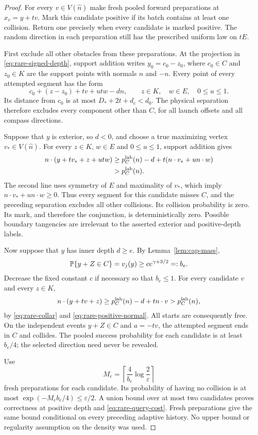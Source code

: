 \begin{proof}
For every $v\in V(\widehat n)$ make fresh pooled forward preparations
at $x_v=y+tv$. Mark this candidate positive if its batch contains at
least one collision. Return one precisely when every candidate is
marked positive. The random direction in each preparation still has
the prescribed uniform law on $tE$.

First exclude all other obstacles from these preparations. At the
projection in \eqref{eq:rare-signed-depth}, support addition writes
$y_0=c_0-z_0$, where $c_0\in C$ and $z_0\in K$ are the support
points with normals $n$ and $-n$. Every point of every attempted
segment has the form
\[
 c_0+(z-z_0)+tv+utw-dn,
       \qquad z\in K,\quad w\in E,\quad 0\le u\le1.
\]
Its distance from $c_0$ is at most $D_*+2t+d_c<d_0$. The physical
separation therefore excludes every component other than $C$, for
all launch offsets and all compass directions.

Suppose that $y$ is exterior, so $d<0$, and choose a true maximizing
vertex $v_*\in V(\widehat n)$. For every $z\in K$, $w\in E$ and
$0\le u\le1$, support addition gives
\begin{align*}
 n\cdot(y+tv_*+z+utw)
 &\ge p_C^{\rm lab}(n)-d+t(n\cdot v_*+u n\cdot w)\\
 &>p_C^{\rm lab}(n).
\end{align*}
The second line uses symmetry of $E$ and maximality of $v_*$, which
imply $n\cdot v_*+u n\cdot w\ge0$. Thus every segment for this
candidate misses $C$, and the preceding separation excludes all other
collisions. Its collision probability is zero. Its mark, and therefore
the conjunction, is deterministically zero. Possible boundary tangencies
are irrelevant to the asserted exterior and positive-depth labels.

Now suppose that $y$ has inner depth $d\ge e$. By
Lemma~\ref{lem:cap-mass},
\[
        \mathbb P\{y+Z\in C\}=v_j(y)
                    \ge c e^{\gamma+3/2}=:b_e.
\]
Decrease the fixed constant $c$ if necessary so that $b_e\le1$.
For every candidate $v$ and every $z\in K$,
\[
 n\cdot(y+tv+z)
       \ge p_C^{\rm lab}(n)-d+t n\cdot v
       >p_C^{\rm lab}(n),
\]
by \eqref{eq:rare-collar} and \eqref{eq:rare-positive-normal}.
All starts are consequently free. On the independent events
$y+Z\in C$ and $a=-tv$, the attempted segment ends in $C$ and
collides. The pooled success probability for each candidate is at
least $b_e/4$; the selected direction need never be revealed.

Use
\[
            M_e=\left\lceil\frac4{b_e}
                                     \log\frac2\varepsilon\right\rceil
\]
fresh preparations for each candidate. Its probability of having no
collision is at most $\exp(-M_eb_e/4)\le\varepsilon/2$.
A union bound over at most two candidates proves correctness at
positive depth and \eqref{eq:rare-query-cost}. Fresh preparations give
the same bound conditional on every preceding adaptive history.
No upper bound or regularity assumption on the density was used.
\end{proof}

